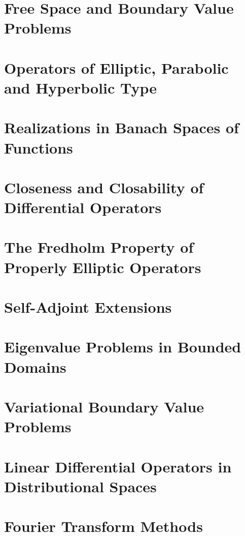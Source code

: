 \documentclass[11pt,twoside]{article}
\begin{document}
\section{Free Space and Boundary Value Problems}
\section{Operators of Elliptic, Parabolic and Hyperbolic Type}
\section{Realizations in Banach Spaces of Functions}
\section{Closeness and Closability of Differential Operators}
\section{The Fredholm Property of Properly Elliptic Operators}
\section{Self-Adjoint Extensions}
\section{Eigenvalue Problems in Bounded Domains}
\section{Variational Boundary Value Problems}
\section{Linear Differential Operators in Distributional Spaces}
\section{Fourier Transform Methods}
\end{document}
